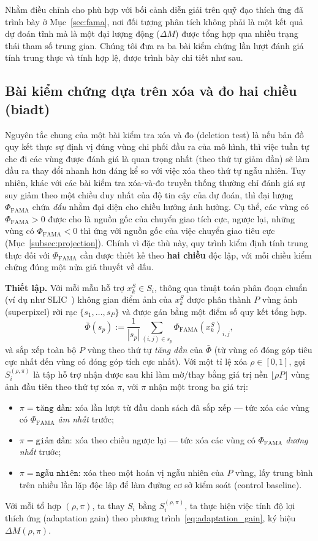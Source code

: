  Nhằm điều chỉnh cho phù hợp với bối cảnh diễn giải trên quỹ đạo thích ứng đã trình bày ở Mục~\ref{sec:fama}, nơi đối tượng phân tích không phải là một kết quả dự đoán tĩnh mà là một đại lượng động ($\Delta M$) được tổng hợp qua nhiều trạng thái tham số trung gian. Chúng tôi đưa ra ba bài kiểm chứng lần lượt đánh giá tính trung thực và tính hợp lệ, được trình bày chi tiết như sau.
 
\subsection{Bài kiểm chứng dựa trên xóa và đo hai chiều (\acrfull{biadt})}
\label{subsec:biadt}
Nguyên tắc chung của một bài kiểm tra xóa và đo (deletion test) là nếu bản đồ quy kết thực sự định vị đúng vùng chi phối đầu ra của mô hình, thì việc tuần tự che đi các vùng được đánh giá là quan trọng nhất (theo thứ tự giảm dần) sẽ làm đầu ra thay đổi nhanh hơn đáng kể so với việc xóa theo thứ tự ngẫu nhiên. Tuy nhiên, khác với các bài kiểm tra xóa-và-đo truyền thống thường chỉ đánh giá sự suy giảm theo một chiều duy nhất của độ tin cậy của dự đoán, thì đại lượng $\Phi_{\text{FAMA}}$ chứa \emph{dấu} nhằm đại diện cho chiều hướng ảnh hưởng. Cụ thể, các vùng có $\Phi_{\text{FAMA}}>0$ được cho là nguồn gốc của chuyển giao tích cực, ngược lại, những vùng có $\Phi_{\text{FAMA}}<0$ thì ứng với nguồn gốc của việc chuyển giao tiêu cực (Mục~\ref{subsec:projection}). Chính vì đặc thù này, quy trình kiểm định tính trung thực đối với $\Phi_{\text{FAMA}}$ cần được thiết kế theo \textbf{hai chiều} độc lập, với mỗi chiều kiểm chứng đúng một nửa giả thuyết về dấu.
 
\textbf{Thiết lập.} Với mỗi mẫu hỗ trợ $x_k^S \in S_i$, thông qua thuật toán phân đoạn chuẩn (ví dụ như SLIC~\cite{achanta2012slic}) không gian điểm ảnh của $x_k^S$ được phân thành $P$ vùng ảnh (superpixel) rời rạc $\{s_1, \dots, s_P\}$ và được gán bằng một điểm số quy kết tổng hợp.
\[
    \bar{\Phi}(s_p) := \frac{1}{|s_p|}\sum_{(i,j)\in s_p} \Phi_{\text{FAMA}}(x_k^S)_{i,j},
\]
và sắp xếp toàn bộ $P$ vùng theo thứ tự \emph{tăng dần} của $\bar\Phi$ (từ vùng có đóng góp tiêu cực nhất đến vùng có đóng góp tích cực nhất). Với một tỉ lệ xóa $\rho \in [0,1]$, gọi $S_i^{(\rho,\pi)}$ là tập hỗ trợ nhận được sau khi làm mờ/thay bằng giá trị nền $\lfloor \rho P \rfloor$ vùng ảnh đầu tiên theo thứ tự xóa $\pi$, với $\pi$ nhận một trong ba giá trị:
\begin{itemize}
    \item $\pi = \texttt{tăng dần}$: xóa lần lượt từ đầu danh sách đã sắp xếp — tức xóa các vùng có $\Phi_{\text{FAMA}}$ \emph{âm nhất} trước;
    \item $\pi = \texttt{giảm dần}$: xóa theo chiều ngược lại — tức xóa các vùng có $\Phi_{\text{FAMA}}$ \emph{dương nhất} trước;
    \item $\pi = \texttt{ngẫu nhiên}$: xóa theo một hoán vị ngẫu nhiên của $P$ vùng, lấy trung bình trên nhiều lần lặp độc lập để làm đường cơ sở kiểm soát (control baseline).
\end{itemize}
Với mỗi tổ hợp $(\rho,\pi)$, ta thay $S_i$ bằng $S_i^{(\rho,\pi)}$, ta thực hiện việc tính độ lợi thích ứng (adaptation gain) theo phương trình~\eqref{eq:adaptation_gain}, ký hiệu $\Delta M(\rho,\pi)$.
 
